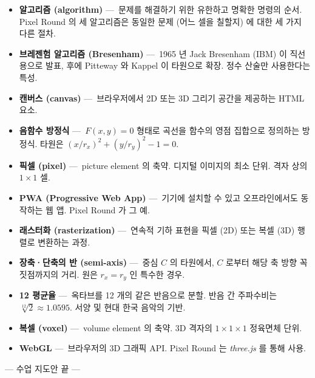 \documentclass[12pt,a4paper]{scrartcl}
\newcommand{\acc}[1]{\textcolor{accent}{\textbf{#1}}}
\begin{document}
\begin{itemize}[leftmargin=1.4em,itemsep=0.3em,topsep=0.3em]
  \item \acc{알고리즘 (algorithm)} ---\, 문제를 해결하기 위한 유한하고 명확한 명령의 순서. Pixel Round 의 세 알고리즘은 동일한 문제 (어느 셀을 칠할지) 에 대한 세 가지 다른 절차.
  \item \acc{브레젠험 알고리즘 (Bresenham)} ---\, 1965 년 Jack Bresenham (IBM) 이 직선용으로 발표, 후에 Pitteway 와 Kappel 이 타원으로 확장. 정수 산술만 사용한다는 특성.
  \item \acc{캔버스 (canvas)} ---\, 브라우저에서 2D 또는 3D 그리기 공간을 제공하는 HTML 요소.
  \item \acc{음함수 방정식} ---\, $F(x, y) = 0$ 형태로 곡선을 함수의 영점 집합으로 정의하는 방정식. 타원은 $(x/r_x)^2 + (y/r_y)^2 - 1 = 0$.
  \item \acc{픽셀 (pixel)} ---\, picture element 의 축약. 디지털 이미지의 최소 단위. 격자 상의 $1 \times 1$ 셀.
  \item \acc{PWA (Progressive Web App)} ---\, 기기에 설치할 수 있고 오프라인에서도 동작하는 웹 앱. Pixel Round 가 그 예.
  \item \acc{래스터화 (rasterization)} ---\, 연속적 기하 표현을 픽셀 (2D) 또는 복셀 (3D) 행렬로 변환하는 과정.
  \item \acc{장축·단축의 반 (semi-axis)} ---\, 중심 $C$ 의 타원에서, $C$ 로부터 해당 축 방향 꼭짓점까지의 거리. 원은 $r_x = r_y$ 인 특수한 경우.
  \item \acc{12 평균율} ---\, 옥타브를 12 개의 같은 반음으로 분할. 반음 간 주파수비는 $\sqrt[12]{2} \approx 1.0595$. 서양 및 현대 한국 음악의 기반.
  \item \acc{복셀 (voxel)} ---\, volume element 의 축약. 3D 격자의 $1 \times 1 \times 1$ 정육면체 단위.
  \item \acc{WebGL} ---\, 브라우저의 3D 그래픽 API. Pixel Round 는 \emph{three.js} 를 통해 사용.
\end{itemize}

\vspace{2em}
\begin{center}
\color{muted}\small\sffamily
--- 수업 지도안 끝 ---
\end{center}
\end{document}
